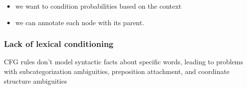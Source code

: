\documentclass[11pt]{article}
\begin{document}
\begin{minipage}[l]{.5\linewidth}
    \begin{figure}[H]
        \centering
    \end{figure}    
\end{minipage}\hfill
\begin{minipage}[r]{.48\linewidth}
    \begin{itemize}
        \item we want to condition probabilities based on the context
        \item we can annotate each node with its parent.
    \end{itemize}
\end{minipage}

\begin{figure}[H]
    \centering
\end{figure}    

\subsubsection{Lack of lexical conditioning}

CFG rules don't model syntactic facts about speciﬁc words, leading to problems with subcategorization ambiguities, preposition attachment, and coordinate structure ambiguities
\end{document}
